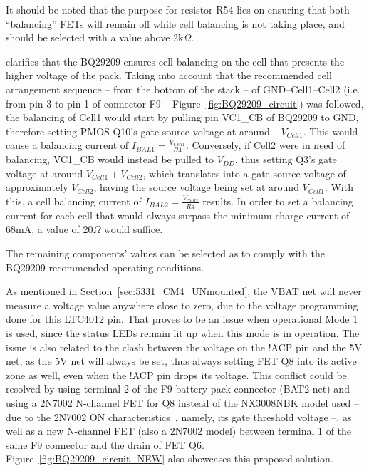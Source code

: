 
\noindent It should be noted that the purpose for resistor R54 lies on ensuring that both ``balancing'' FETs will remain off while cell balancing is not taking place, and should be selected with a value above 2k$\Omega$.

\cite{bq29209} clarifies that the BQ29209 ensures cell balancing on the cell that presents the higher voltage of the pack.
Taking into account that the recommended cell arrangement sequence -- from the bottom of the stack -- of GND--Cell1--Cell2 (i.e. from pin 3 to pin 1 of connector F9 -- Figure~\ref{fig:BQ29209_circuit}) was followed, the balancing of Cell1 would start by pulling pin VC1\_CB of BQ29209 to GND, therefore setting PMOS Q10's gate-source voltage at around $-V_{Cell1}$. This would cause a balancing current of $I_{BAL1}=\frac{V_{Cell1}}{R4}$. Conversely, if Cell2 were in need of balancing, VC1\_CB would instead be pulled to $V_{DD}$, thus setting Q3's gate voltage at around $V_{Cell1}+V_{Cell2}$, which translates into a gate-source voltage of approximately $V_{Cell2}$, having the source voltage being set at around $V_{Cell1}$. With this, a cell balancing current of $I_{BAL2}=\frac{V_{Cell2}}{R4}$ results. In order to set a balancing current for each cell that would always surpass the minimum charge current of 68mA, a value of 20$\Omega$ would suffice. 

The remaining components' values can be selected as to comply with the BQ29209 recommended operating conditions.

As mentioned in Section~\ref{sec:5331_CM4_UNmounted}, the VBAT net will never measure a voltage value anywhere close to zero, due to the voltage programming done for this LTC4012 pin. That proves to be an issue when operational Mode 1 is used, since the status LEDs remain lit up when this mode is in operation. The issue is also related to the clash between the voltage on the !ACP pin and the 5V net, as the 5V net will always be set, thus always setting FET Q8 into its active zone as well, even when the !ACP pin drops its voltage. This conflict could be resolved by using terminal 2 of the F9 battery pack connector (BAT2 net) and using a 2N7002 N-channel FET for Q8 instead of the NX3008NBK model used -- due to the 2N7002 ON characteristics~\cite{2N7002}, namely, its gate threshold voltage --, as well as a new N-channel FET (also a 2N7002 model) between terminal 1 of the same F9 connector and the drain of FET Q6. Figure~\ref{fig:BQ29209_circuit_NEW} also showcases this proposed solution.

